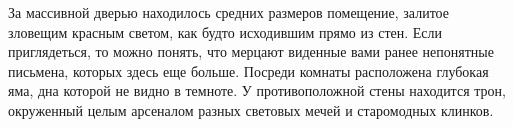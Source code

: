 За массивной дверью находилось средних размеров помещение, залитое зловещим красным светом, как будто исходившим прямо из стен.
Если приглядеться, то можно понять, что мерцают виденные вами ранее непонятные письмена, которых здесь еще больше.
Посреди комнаты расположена глубокая яма, дна которой не видно в темноте. 
У противоположной стены находится трон, окруженный целым арсеналом разных световых мечей и старомодных клинков.
